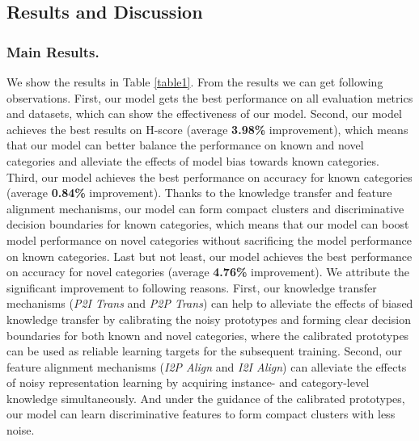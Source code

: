 \documentclass[letterpaper]{article} %
\begin{document}
\subsection{Results and Discussion}

\subsubsection{Main Results. }
We show the results in Table \ref{table1}. From the results we can get following observations. 
First, our model gets the best performance on all evaluation metrics and datasets, which can show the effectiveness of our model. 
Second, our model achieves the best results on H-score (average \textbf{3.98\%} improvement), which means that our model can better balance the performance on known and novel categories and alleviate the effects of model bias towards known categories. 
Third, our model achieves the best performance on accuracy for known categories (average \textbf{0.84\%} improvement). Thanks to the knowledge transfer and feature alignment mechanisms, our model can form compact clusters and discriminative decision boundaries for known categories, which means that our model can boost model performance on novel categories without sacrificing the model performance on known categories.
Last but not least, our model achieves the best performance on accuracy for novel categories (average \textbf{4.76\%} improvement). We attribute the significant improvement to following reasons. First, our knowledge transfer mechanisms (\textit{P2I Trans} and \textit{P2P Trans}) can help to alleviate the effects of biased knowledge transfer by calibrating the noisy prototypes and forming clear decision boundaries for both known and novel categories, where the calibrated prototypes can be used as reliable learning targets for the subsequent training. Second, our feature alignment mechanisms (\textit{I2P Align} and \textit{I2I Align}) can alleviate the effects of noisy representation learning by acquiring instance- and category-level knowledge simultaneously. And under the guidance of the calibrated prototypes, our model can learn discriminative features to form compact clusters with less noise.
\end{document}
